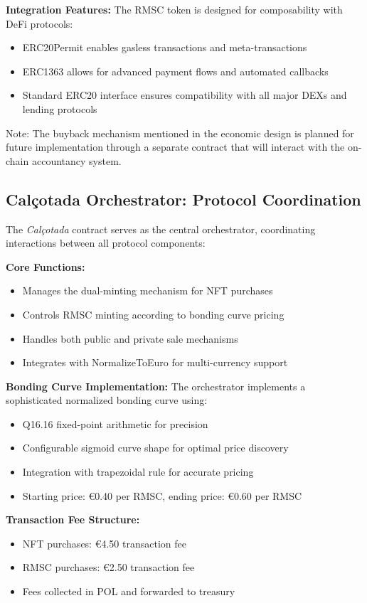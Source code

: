 \documentclass[conference]{IEEEtran}
\begin{document}
\textbf{Integration Features:}
The RMSC token is designed for composability with DeFi protocols:
\begin{itemize}
    \item ERC20Permit enables gasless transactions and meta-transactions
    \item ERC1363 allows for advanced payment flows and automated callbacks
    \item Standard ERC20 interface ensures compatibility with all major DEXs and lending protocols
\end{itemize}

Note: The buyback mechanism mentioned in the economic design is planned for future implementation through a separate contract that will interact with the on-chain accountancy system.

\subsection{Calçotada Orchestrator: Protocol Coordination}

The \textit{Calçotada} contract serves as the central orchestrator, coordinating interactions between all protocol components:

\textbf{Core Functions:}
\begin{itemize}
    \item Manages the dual-minting mechanism for NFT purchases
    \item Controls RMSC minting according to bonding curve pricing
    \item Handles both public and private sale mechanisms
    \item Integrates with NormalizeToEuro for multi-currency support
\end{itemize}

\textbf{Bonding Curve Implementation:}
The orchestrator implements a sophisticated normalized bonding curve using:
\begin{itemize}
    \item Q16.16 fixed-point arithmetic for precision
    \item Configurable sigmoid curve shape for optimal price discovery
    \item Integration with trapezoidal rule for accurate pricing
    \item Starting price: €0.40 per RMSC, ending price: €0.60 per RMSC
\end{itemize}

\textbf{Transaction Fee Structure:}
\begin{itemize}
    \item NFT purchases: €4.50 transaction fee
    \item RMSC purchases: €2.50 transaction fee
    \item Fees collected in POL and forwarded to treasury
\end{itemize}
\end{document}
